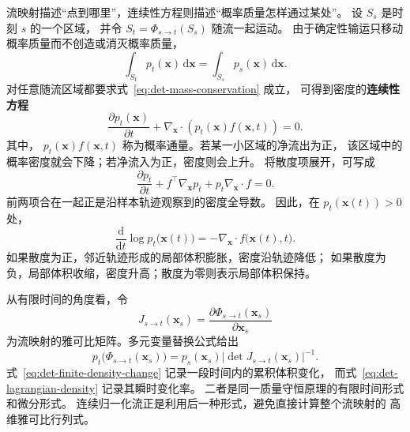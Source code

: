 \documentclass[UTF8,a4paper,zihao=-4,oneside,openany]{ctexbook}
\begin{document}
流映射描述“点到哪里”，连续性方程则描述“概率质量怎样通过某处”。
设 \(S_s\) 是时刻 \(s\) 的一个区域，
并令 \(S_t=\Phi_{s\to t}(S_s)\) 随流一起运动。
由于确定性输运只移动概率质量而不创造或消灭概率质量，
\begin{equation}
    \int_{S_t}p_t(\mathbf{x})\,\mathrm{d}\mathbf{x}
    =
    \int_{S_s}p_s(\mathbf{x})\,\mathrm{d}\mathbf{x}.
    \label{eq:det-mass-conservation}
\end{equation}
对任意随流区域都要求式~\eqref{eq:det-mass-conservation} 成立，
可得到密度的\textbf{连续性方程}
\begin{equation}
    \frac{\partial p_t(\mathbf{x})}{\partial t}
    +
    \nabla_{\mathbf{x}}\cdot
    \left(
        p_t(\mathbf{x})f(\mathbf{x},t)
    \right)
    =
    0.
    \label{eq:det-continuity}
\end{equation}
其中，
\(p_t(\mathbf{x})f(\mathbf{x},t)\)
称为概率通量。若某一小区域的净流出为正，
该区域中的概率密度就会下降；若净流入为正，密度则会上升。
将散度项展开，可写成
\begin{equation}
    \frac{\partial p_t}{\partial t}
    +
    f^\top\nabla_{\mathbf{x}}p_t
    +
    p_t\nabla_{\mathbf{x}}\cdot f
    =
    0.
    \label{eq:det-continuity-expanded}
\end{equation}
前两项合在一起正是沿样本轨迹观察到的密度全导数。
因此，在 \(p_t(\mathbf{x}(t))>0\) 处，
\begin{equation}
    \frac{\mathrm{d}}{\mathrm{d}t}
    \log p_t\bigl(\mathbf{x}(t)\bigr)
    =
    -
    \nabla_{\mathbf{x}}\cdot
    f\bigl(\mathbf{x}(t),t\bigr).
    \label{eq:det-lagrangian-density}
\end{equation}
如果散度为正，邻近轨迹形成的局部体积膨胀，密度沿轨迹降低；
如果散度为负，局部体积收缩，密度升高；散度为零则表示局部体积保持。

从有限时间的角度看，令
\[
    J_{s\to t}(\mathbf{x}_s)
    =
    \frac{\partial\Phi_{s\to t}(\mathbf{x}_s)}
    {\partial\mathbf{x}_s}
\]
为流映射的雅可比矩阵。多元变量替换公式给出
\begin{equation}
    p_t\bigl(\Phi_{s\to t}(\mathbf{x}_s)\bigr)
    =
    p_s(\mathbf{x}_s)
    \left|
        \det J_{s\to t}(\mathbf{x}_s)
    \right|^{-1}.
    \label{eq:det-finite-density-change}
\end{equation}
式~\eqref{eq:det-finite-density-change} 记录一段时间内的累积体积变化，
而式~\eqref{eq:det-lagrangian-density} 记录其瞬时变化率。
二者是同一质量守恒原理的有限时间形式和微分形式。
连续归一化流正是利用后一种形式，避免直接计算整个流映射的
高维雅可比行列式。
\end{document}
